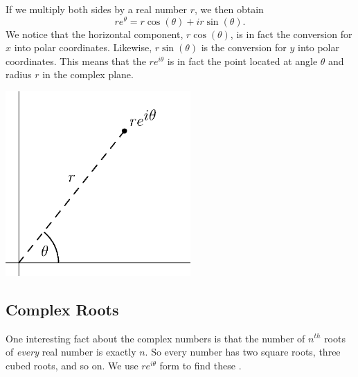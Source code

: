 If we multiply both sides by a real number $r$, we then obtain $$ re^\theta=r\cos(\theta)+ir\sin(\theta).$$
We notice that the horizontal component, $r\cos(\theta)$, is in fact the conversion for $x$ into polar coordinates.  Likewise, $r\sin(\theta)$ is the conversion for $y$ into polar coordinates.  This means that the  $re^{i\theta}$ is in fact the point located at angle $\theta $ and radius $r$ in the complex plane.  
\begin{center}	\includegraphics[width=200pt]{ChapterComplex/Figures/polarcart.eps}
\end{center}

\subsection{Complex Roots}
 
One interesting fact about the complex numbers is that the number of $n^{th}$ roots of \emph{every} real number is exactly $n$.  So every number has two square roots, three cubed roots, and so on.  We use $re^{i\theta}$ form to find these .

